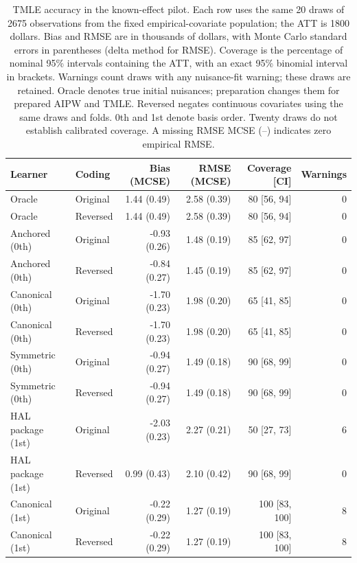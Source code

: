 \begin{table}[p]
\centering
\small
\caption{TMLE accuracy in the known-effect pilot. Each row uses the same 20 draws of 2675 observations from the fixed empirical-covariate population; the ATT is 1800 dollars. Bias and RMSE are in thousands of dollars, with Monte Carlo standard errors in parentheses (delta method for RMSE). Coverage is the percentage of nominal 95\% intervals containing the ATT, with an exact 95\% binomial interval in brackets. Warnings count draws with any nuisance-fit warning; these draws are retained. Oracle denotes true initial nuisances; preparation changes them for prepared AIPW and TMLE. Reversed negates continuous covariates using the same draws and folds. 0th and 1st denote basis order. Twenty draws do not establish calibrated coverage. A missing RMSE MCSE (--) indicates zero empirical RMSE.}
\label{tab:semisynth-tmle}

\begin{tabular}{llrrrr}
\toprule
Learner & Coding & Bias (MCSE) & RMSE (MCSE) & Coverage [CI] & Warnings\\
\midrule
Oracle & Original & 1.44 (0.49) & 2.58 (0.39) & 80 [56, 94] & 0\\
Oracle & Reversed & 1.44 (0.49) & 2.58 (0.39) & 80 [56, 94] & 0\\
\addlinespace
Anchored (0th) & Original & -0.93 (0.26) & 1.48 (0.19) & 85 [62, 97] & 0\\
Anchored (0th) & Reversed & -0.84 (0.27) & 1.45 (0.19) & 85 [62, 97] & 0\\
\addlinespace
Canonical (0th) & Original & -1.70 (0.23) & 1.98 (0.20) & 65 [41, 85] & 0\\
Canonical (0th) & Reversed & -1.70 (0.23) & 1.98 (0.20) & 65 [41, 85] & 0\\
\addlinespace
Symmetric (0th) & Original & -0.94 (0.27) & 1.49 (0.18) & 90 [68, 99] & 0\\
Symmetric (0th) & Reversed & -0.94 (0.27) & 1.49 (0.18) & 90 [68, 99] & 0\\
\addlinespace
HAL package (1st) & Original & -2.03 (0.23) & 2.27 (0.21) & 50 [27, 73] & 6\\
HAL package (1st) & Reversed & 0.99 (0.43) & 2.10 (0.42) & 90 [68, 99] & 0\\
\addlinespace
Canonical (1st) & Original & -0.22 (0.29) & 1.27 (0.19) & 100 [83, 100] & 8\\
Canonical (1st) & Reversed & -0.22 (0.29) & 1.27 (0.19) & 100 [83, 100] & 8\\
\bottomrule
\end{tabular}
\end{table}

